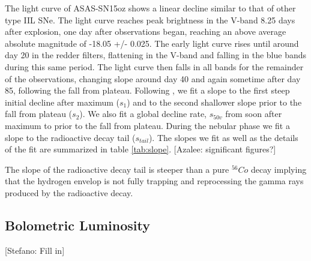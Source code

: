\documentclass[preprint]{aastex61}
\newcommand{\azaleecomment}[1]{{\color{red} [{#1}]}}
\newcommand{\Azalee}[1]{\azaleecomment{Azalee: #1}}
\newcommand{\stefanocomment}[1]{{\color{cyan} [{#1}]}}
\newcommand{\Stefano}[1]{\stefanocomment{Stefano: #1}}
\begin{document}
The light curve of ASAS-SN15oz shows a linear decline similar to that of other type IIL SNe. 
The light curve reaches peak brightness in the V-band 8.25 days after explosion, one day after observations began, reaching an above average absolute magnitude of -18.05 +/- 0.025.
The early light curve rises until around day 20 in the redder filters, flattening in the V-band and falling in the blue bands during this same period. 
The light curve then falls in all bands for the remainder of the observations, changing slope around day 40 and again sometime after day 85, following the fall from plateau. 
Following \citep{2014Anderson}, we fit a slope to the first steep initial decline after maximum ($s_1$) and to the second shallower slope prior to the fall from plateau ($s_2$). 
We also fit a global decline rate, $s_{50v}$ from soon after maximum to prior to the fall from plateau.
During the nebular phase we fit a slope to the radioactive decay tail ($s_{tail}$). 
The slopes we fit as well as the details of the fit are summarized in table \ref{tab:slope}.
\Azalee{significant figures?}

The slope of the radioactive decay tail is steeper than a pure ${}^{56}Co$ decay implying that the hydrogen envelop is not fully trapping and reprocessing the gamma rays produced by the radioactive decay.

\subsection{Bolometric Luminosity}
\Stefano{Fill in}
\end{document}
